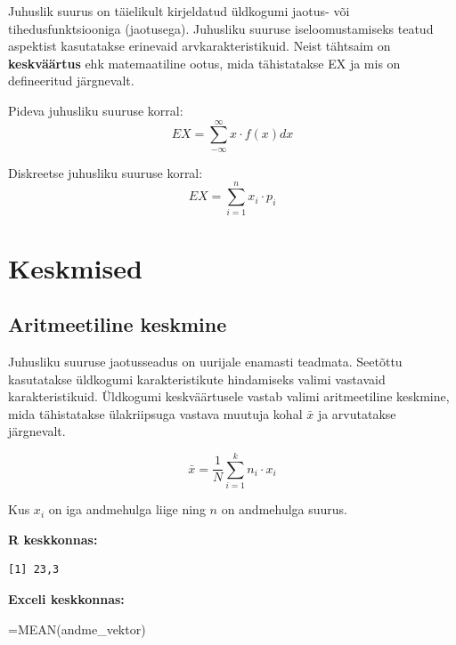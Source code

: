 \documentclass[
]{book}
\newenvironment{Shaded}{\begin{snugshade}}{\end{snugshade}}
\newcommand{\CommentTok}[1]{\textcolor[rgb]{0.56,0.35,0.01}{\textit{#1}}}
\newcommand{\FunctionTok}[1]{\textcolor[rgb]{0.13,0.29,0.53}{\textbf{#1}}}
\newcommand{\NormalTok}[1]{#1}
\newcommand{\OtherTok}[1]{\textcolor[rgb]{0.56,0.35,0.01}{#1}}
\newcommand{\SpecialCharTok}[1]{\textcolor[rgb]{0.81,0.36,0.00}{\textbf{#1}}}
\newcommand{\StringTok}[1]{\textcolor[rgb]{0.31,0.60,0.02}{#1}}
\renewenvironment{Shaded} {\begin{snugshade}\footnotesize} {\end{snugshade}}
\theoremstyle{definition}
\theoremstyle{definition}
\theoremstyle{definition}
\theoremstyle{definition}
\theoremstyle{remark}
\begin{document}
Juhuslik suurus on täielikult kirjeldatud üldkogumi jaotus- või tihedusfunktsiooniga (jaotusega). Juhusliku suuruse iseloomustamiseks teatud aspektist kasutatakse erinevaid arvkarakteristikuid. Neist tähtsaim on \textbf{keskväärtus} ehk matemaatiline ootus, mida tähistatakse EX ja mis on defineeritud järgnevalt.

Pideva juhusliku suuruse korral:
\[EX = \sum_{-\infty}^{\infty} x \cdot f(x) dx\]

Diskreetse juhusliku suuruse korral:
\[EX = \sum_{i=1}^{n} x_i \cdot p_i\]

\section{Keskmised}\label{keskmised}

\subsection{Aritmeetiline keskmine}\label{aritmeetiline-keskmine}

Juhusliku suuruse jaotusseadus on uurijale enamasti teadmata. Seetõttu kasutatakse üldkogumi karakteristikute hindamiseks valimi vastavaid karakteristikuid. Üldkogumi keskväärtusele vastab valimi aritmeetiline keskmine, mida tähistatakse ülakriipsuga vastava muutuja kohal \(\bar x\) ja arvutatakse järgnevalt.

\[ \bar x=\frac{1}{N}\sum_{i=1}^{k}n_i \cdot x_i \]

Kus \(x_{i}\) on iga andmehulga liige ning \(n\) on andmehulga suurus.

\textbf{R keskkonnas:}

\begin{Shaded}
\end{Shaded}

\begin{verbatim}
[1] 23,3
\end{verbatim}

\textbf{Exceli keskkonnas:}

\begin{naideExcel}
=MEAN(andme_vektor)

\end{naideExcel}
\end{document}

